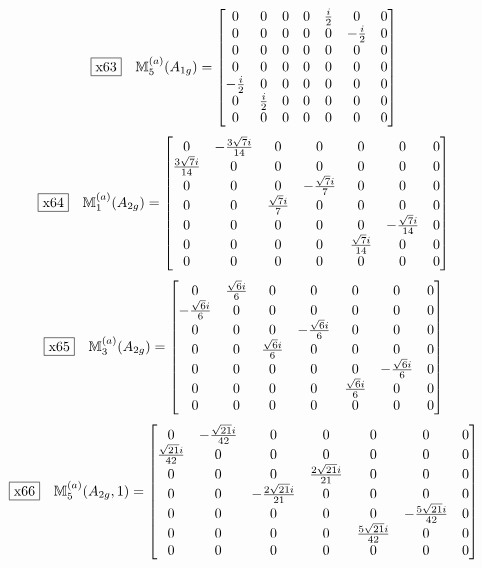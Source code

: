 \documentclass[fleqn,10pt,landscape]{jsarticle}
\begin{document}
\begin{dmath*}
\fbox{x63}\quad \mathbb{M}_{5}^{(a)}(A_{1g})=\begin{bmatrix} 0 & 0 & 0 & 0 & \frac{i}{2} & 0 & 0 \\ 0 & 0 & 0 & 0 & 0 & - \frac{i}{2} & 0 \\ 0 & 0 & 0 & 0 & 0 & 0 & 0 \\ 0 & 0 & 0 & 0 & 0 & 0 & 0 \\ - \frac{i}{2} & 0 & 0 & 0 & 0 & 0 & 0 \\ 0 & \frac{i}{2} & 0 & 0 & 0 & 0 & 0 \\ 0 & 0 & 0 & 0 & 0 & 0 & 0 \end{bmatrix}
\end{dmath*}
\begin{dmath*}
\fbox{x64}\quad \mathbb{M}_{1}^{(a)}(A_{2g})=\begin{bmatrix} 0 & - \frac{3 \sqrt{7} i}{14} & 0 & 0 & 0 & 0 & 0 \\ \frac{3 \sqrt{7} i}{14} & 0 & 0 & 0 & 0 & 0 & 0 \\ 0 & 0 & 0 & - \frac{\sqrt{7} i}{7} & 0 & 0 & 0 \\ 0 & 0 & \frac{\sqrt{7} i}{7} & 0 & 0 & 0 & 0 \\ 0 & 0 & 0 & 0 & 0 & - \frac{\sqrt{7} i}{14} & 0 \\ 0 & 0 & 0 & 0 & \frac{\sqrt{7} i}{14} & 0 & 0 \\ 0 & 0 & 0 & 0 & 0 & 0 & 0 \end{bmatrix}
\end{dmath*}
\begin{dmath*}
\fbox{x65}\quad \mathbb{M}_{3}^{(a)}(A_{2g})=\begin{bmatrix} 0 & \frac{\sqrt{6} i}{6} & 0 & 0 & 0 & 0 & 0 \\ - \frac{\sqrt{6} i}{6} & 0 & 0 & 0 & 0 & 0 & 0 \\ 0 & 0 & 0 & - \frac{\sqrt{6} i}{6} & 0 & 0 & 0 \\ 0 & 0 & \frac{\sqrt{6} i}{6} & 0 & 0 & 0 & 0 \\ 0 & 0 & 0 & 0 & 0 & - \frac{\sqrt{6} i}{6} & 0 \\ 0 & 0 & 0 & 0 & \frac{\sqrt{6} i}{6} & 0 & 0 \\ 0 & 0 & 0 & 0 & 0 & 0 & 0 \end{bmatrix}
\end{dmath*}
\begin{dmath*}
\fbox{x66}\quad \mathbb{M}_{5}^{(a)}(A_{2g},1)=\begin{bmatrix} 0 & - \frac{\sqrt{21} i}{42} & 0 & 0 & 0 & 0 & 0 \\ \frac{\sqrt{21} i}{42} & 0 & 0 & 0 & 0 & 0 & 0 \\ 0 & 0 & 0 & \frac{2 \sqrt{21} i}{21} & 0 & 0 & 0 \\ 0 & 0 & - \frac{2 \sqrt{21} i}{21} & 0 & 0 & 0 & 0 \\ 0 & 0 & 0 & 0 & 0 & - \frac{5 \sqrt{21} i}{42} & 0 \\ 0 & 0 & 0 & 0 & \frac{5 \sqrt{21} i}{42} & 0 & 0 \\ 0 & 0 & 0 & 0 & 0 & 0 & 0 \end{bmatrix}
\end{dmath*}
\end{document}
